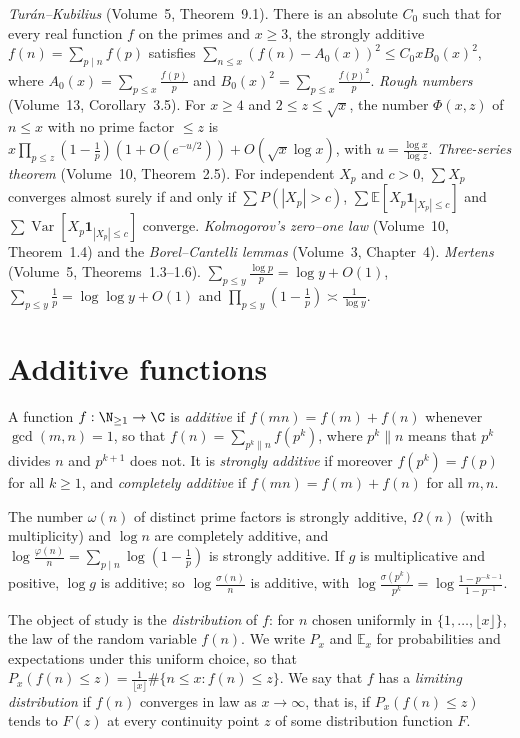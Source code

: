 \begin{reminder}
\emph{Tur\'an--Kubilius} (Volume~5, Theorem~9.1). There is an absolute $C_0$ such that for every real function $f$ on the primes and $x\ge3$, the strongly additive $f(n)=\sum_{p\mid n}f(p)$ satisfies $\sum_{n\le x}(f(n)-A_0(x))^2\le C_0xB_0(x)^2$, where $A_0(x)=\sum_{p\le x}\frac{f(p)}p$ and $B_0(x)^2=\sum_{p\le x}\frac{f(p)^2}p$.
\emph{Rough numbers} (Volume~13, Corollary~3.5). For $x\ge4$ and $2\le z\le\sqrt x$, the number $\Phi(x,z)$ of $n\le x$ with no prime factor $\le z$ is $x\prod_{p\le z}(1-\frac1p)(1+O(e^{-u/2}))+O(\sqrt x\log x)$, with $u=\frac{\log x}{\log z}$.
\emph{Three-series theorem} (Volume~10, Theorem~2.5). For independent $X_p$ and $c>0$, $\sum X_p$ converges almost surely if and only if $\sum P(|X_p|>c)$, $\sum\mathbb E[X_p\mathbf 1_{|X_p|\le c}]$ and $\sum\operatorname{Var}[X_p\mathbf 1_{|X_p|\le c}]$ converge.
\emph{Kolmogorov's zero--one law} (Volume~10, Theorem~1.4) and the \emph{Borel--Cantelli lemmas} (Volume~3, Chapter~4).
\emph{Mertens} (Volume~5, Theorems~1.3--1.6). $\sum_{p\le y}\frac{\log p}p=\log y+O(1)$, $\sum_{p\le y}\frac1p=\log\log y+O(1)$ and $\prod_{p\le y}(1-\frac1p)\asymp\frac1{\log y}$.
\end{reminder}

\section{Additive functions}

\begin{definition}\label{def:additive}
A function $f:\N_{\ge1}\to\C$ is \emph{additive} if $f(mn)=f(m)+f(n)$ whenever $\gcd(m,n)=1$, so that $f(n)=\sum_{p^k\parallel n}f(p^k)$, where $p^k\parallel n$ means that $p^k$ divides $n$ and $p^{k+1}$ does not. It is \emph{strongly additive} if moreover $f(p^k)=f(p)$ for all $k\ge1$, and \emph{completely additive} if $f(mn)=f(m)+f(n)$ for all $m,n$.
\end{definition}

The number $\omega(n)$ of distinct prime factors is strongly additive, $\Omega(n)$ (with multiplicity) and $\log n$ are completely additive, and $\log\frac{\varphi(n)}n=\sum_{p\mid n}\log(1-\frac1p)$ is strongly additive. If $g$ is multiplicative and positive, $\log g$ is additive; so $\log\frac{\sigma(n)}n$ is additive, with $\log\frac{\sigma(p^k)}{p^k}=\log\frac{1-p^{-k-1}}{1-p^{-1}}$.

The object of study is the \emph{distribution} of $f$: for $n$ chosen uniformly in $\{1,\dots,\lfloor x\rfloor\}$, the law of the random variable $f(n)$. We write $P_x$ and $\mathbb E_x$ for probabilities and expectations under this uniform choice, so that $P_x(f(n)\le z)=\frac1{\lfloor x\rfloor}\#\{n\le x:f(n)\le z\}$. We say that $f$ has a \emph{limiting distribution} if $f(n)$ converges in law as $x\to\infty$, that is, if $P_x(f(n)\le z)$ tends to $F(z)$ at every continuity point $z$ of some distribution function $F$.

